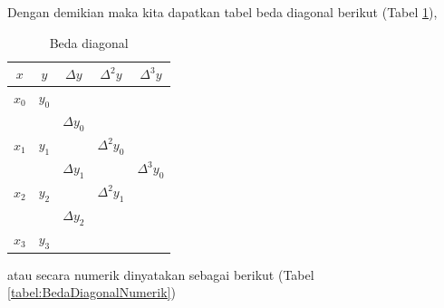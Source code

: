 Dengan demikian maka kita dapatkan tabel beda diagonal berikut (Tabel \ref{tabel:BedaDiagonal}),

\begin{table}[!htbp]
\centering
\caption{Beda diagonal}
\label{tabel:BedaDiagonal}
\begin{tabular}{@{}|c|c|c|c|c|@{}}
\hline
$x$  & $y$  & $\Delta y$     & $\Delta^2 y$ & $\Delta^3 y$ \\\hline
$x_0$ & $y_0$ &             &          &          \\
   &    & $\Delta y_0$ &          &          \\
$x_1$ & $y_1$ &             & $\Delta^2 y_0$      &          \\
   &    & $\Delta y_1$      &          & $\Delta^3 y_0$      \\
$x_2$ & $y_2$ &             & $\Delta^2 y_1$      &          \\
   &    & $\Delta y_2$    &          &          \\
$x_3$ & $y_3$ &             &          &          \\ \hline
\end{tabular}
\end{table}

atau secara numerik dinyatakan sebagai berikut (Tabel \ref{tabel:BedaDiagonalNumerik})


